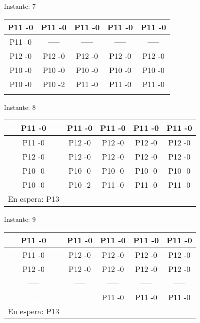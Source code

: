 \documentclass[10pt,a4paper]{article}
\begin{document}
\pagebreak
\begin{center}

Instante: 7

\hfill 
\hfill 
\hfill 
\break 
\begin{tabular}	{ccccc}
\hline  P11 -0 &   P11 -0 &   P11 -0 &   P11 -0 &   P11 -0 &  \\\hline  P11 -0 &   ----- &   ----- &   ----- &   ----- &  \\\hline  P12 -0 &   P12 -0 &   P12 -0 &   P12 -0 &   P12 -0 &  \\\hline  P10 -0 &   P10 -0 &   P10 -0 &   P10 -0 &   P10 -0 &  \\\hline  P10 -0 &   P10 -2 &   P11 -0 &   P11 -0 &   P11 -0 &  \\\hfill 
\hfill 
\hfill 
\break 
\end{tabular}
\end{center}
\pagebreak
\begin{center}

Instante: 8

\hfill 
\hfill 
\hfill 
\break 
\begin{tabular}	{ccccc}
\hline  P11 -0 &   P11 -0 &   P11 -0 &   P11 -0 &   P11 -0 &  \\\hline  P11 -0 &   P12 -0 &   P12 -0 &   P12 -0 &   P12 -0 &  \\\hline  P12 -0 &   P12 -0 &   P12 -0 &   P12 -0 &   P12 -0 &  \\\hline  P10 -0 &   P10 -0 &   P10 -0 &   P10 -0 &   P10 -0 &  \\\hline  P10 -0 &   P10 -2 &   P11 -0 &   P11 -0 &   P11 -0 &  \\\hfill 
\hfill 
\hfill 
\break 
En espera: 	P13 
\end{tabular}
\end{center}
\pagebreak
\begin{center}

Instante: 9

\hfill 
\hfill 
\hfill 
\break 
\begin{tabular}	{ccccc}
\hline  P11 -0 &   P11 -0 &   P11 -0 &   P11 -0 &   P11 -0 &  \\\hline  P11 -0 &   P12 -0 &   P12 -0 &   P12 -0 &   P12 -0 &  \\\hline  P12 -0 &   P12 -0 &   P12 -0 &   P12 -0 &   P12 -0 &  \\\hline  ----- &   ----- &   ----- &   ----- &   ----- &  \\\hline  ----- &   ----- &   P11 -0 &   P11 -0 &   P11 -0 &  \\\hfill 
\hfill 
\hfill 
\break 
En espera: 	P13 
\end{tabular}
\end{center}
\end{document}
